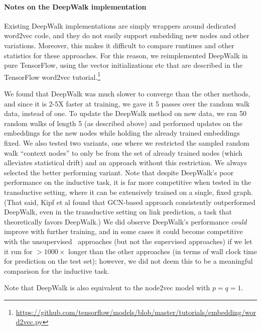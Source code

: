 \paragraph{Notes on the DeepWalk implementation}
Existing DeepWalk implementations \cite{perozzi2014deepwalk,grover2016node2vec} are simply wrappers around dedicated word2vec code, and they do not easily support embedding new nodes and other variations. 
Moreover, this makes it difficult to compare runtimes and other statistics for these approaches.
For this reason, we reimplemented DeepWalk in pure TensorFlow, using the vector initializations etc that are described in the TensorFlow word2vec tutorial.\footnote{\url{https://github.com/tensorflow/models/blob/master/tutorials/embedding/word2vec.py}}

We found that DeepWalk was much slower to converge than the other methods, and since it is 2-5X faster at training, we gave it 5 passes over the random walk data, instead of one.
To update the DeepWalk method on new data, we ran 50 random walks of length 5 (as described above) and performed updates on the embeddings for the new nodes while holding the already trained embeddings fixed. 
We also tested two variants, one where we restricted the sampled random walk ``context nodes'' to only be from the set of already trained nodes (which alleviates statistical drift) and an approach without this restriction. 
We always selected the better performing variant. 
Note that despite DeepWalk's poor performance on the inductive task, it is far more competitive when tested in the transductive setting, where it can be extensively trained on a single, fixed graph. 
(That said, Kipf et al \cite{kipf2016semi}\cite{kipf2016variational} found that GCN-based approach consistently outperformed DeepWalk, even in the transductive setting on link prediction, a task that theoretically favors DeepWalk.)
We did observe DeepWalk's performance {\em could} improve with further training, and in some cases it could become competitive with the unsupervised \name\ approaches (but not the supervised approaches) if we let it run for ${>}1000{\times}$ longer than the other approaches (in terms of wall clock time for prediction on the test set); however, we did not deem this to be a meaningful comparison for the inductive task. 

Note that DeepWalk is also equivalent to the node2vec model \cite{grover2016node2vec} with $p=q=1$. 

